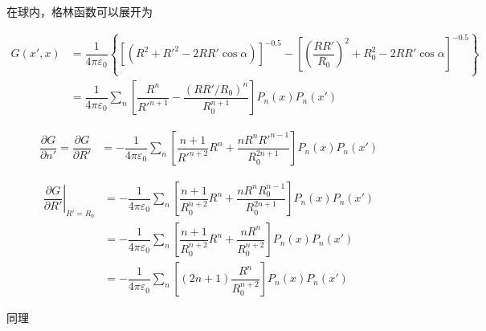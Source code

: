\documentclass{article}
\begin{document}
在球内，格林函数可以展开为

\begin{equation*}
  \begin{aligned}
    G \left( x', x \right) &= 
      \dfrac{1}{4\pi \varepsilon_0} \left\{ \left[ \left( R^2 + R'^2 - 2 R R' \cos \alpha \right) \right]^{-0.5} -
      \left[ \left( \dfrac{R R'}{R_0}  \right)^2 + R_0^2 - 2 RR' \cos \alpha \right]^{-0.5}
    \right\} \\
    &= \dfrac{1}{4\pi \varepsilon_0} \sum_n \left[ \dfrac{R^n}{R'^{n+1}} - \dfrac{\left( RR'/R_0 \right)^n}{R_0^{n+1}}   \right] P_n \left( x \right) P_n \left( x' \right)
  \end{aligned}
\end{equation*}

\begin{equation*}
  \begin{aligned}
    \dfrac{\partial G}{\partial n'} = 
    \dfrac{\partial G}{\partial R'} &=
    - \dfrac{1}{4\pi \varepsilon_0} \sum_n \left[ \dfrac{n+1}{R'^{n+2}} R^n + \dfrac{nR^n R'^{n-1}}{R_0^{2n+1}} \right] P_n \left( x \right) P_n \left( x' \right)
  \end{aligned}
\end{equation*}

\begin{equation*}
  \begin{aligned}
    \left. \dfrac{\partial G}{\partial R'} \right|_{R'=R_0} &=
    - \dfrac{1}{4\pi \varepsilon_0} \sum_n \left[ \dfrac{n+1}{R_0^{n+2}} R^n + \dfrac{nR^n R_0^{n-1}}{R_0^{2n+1}} \right] P_n \left( x \right) P_n \left( x' \right) \\
    &= - \dfrac{1}{4\pi \varepsilon_0} \sum_n \left[ \dfrac{n+1}{R_0^{n+2}} R^n + \dfrac{nR^n }{R_0^{n+2}} \right] P_n \left( x \right) P_n \left( x' \right) \\
    &= - \dfrac{1}{4\pi \varepsilon_0} \sum_n \left[ \left( 2n+1 \right) \dfrac{R^n }{R_0^{n+2}} \right] P_n \left( x \right) P_n \left( x' \right)
  \end{aligned}
\end{equation*}

同理
\end{document}
